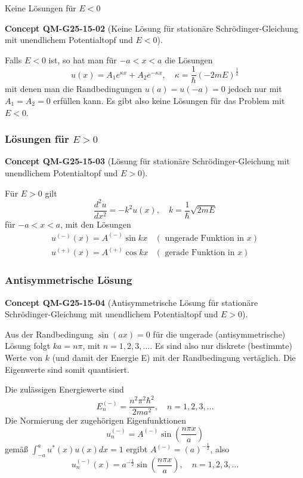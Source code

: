 \documentclass[10pt, letterpaper]{article}
\newcommand{\CustomHeading}[3]{%
  \par\medskip\noindent%
  \textbf{#1 #2} \textnormal{(#3)}.\enskip%
}
\newenvironment{CONC}[2]{\begin{unitbox}\CustomHeading{Concept}{#1}{#2}}{\end{unitbox}}
\begin{document}
Keine Lösungen für $E<0$

\begin{CONC}{QM-G25-15-02}{Keine Lösung für stationäre Schrödinger-Gleichung mit unendlichem Potentialtopf und $E<0$}
Falls $E<0$ ist, so hat man für $-a<x<a$ die Lösungen
$$
u(x)=A_{1} e^{\kappa x}+A_{2} e^{-\kappa x}, \quad \kappa=\frac{1}{\hbar}(-2 m E)^{\frac{1}{2}}
$$
mit denen man die Randbedingungen $u(a)=u(-a)=0$ jedoch nur mit $A_{1}=A_{2}=0$ erfüllen kann. Es gibt also keine Lösungen für das Problem mit $E<0$.
\end{CONC}

\subsubsection*{Lösungen für $E>0$}

\begin{CONC}{QM-G25-15-03}{Lösung für stationäre Schrödinger-Gleichung mit unendlichem Potentialtopf und $E>0$}
Für $E>0$ gilt
$$
\frac{d^{2} u}{d x^{2}}=-k^{2} u(x), \quad k=\frac{1}{\hbar} \sqrt{2 m E}
$$
für $-a<x<a$, mit den Lösungen
$$
\begin{array}{ll}
u^{(-)}(x)=A^{(-)} \sin k x & (\text { ungerade Funktion in } x) \\
u^{(+)}(x)=A^{(+)} \cos k x & (\text { gerade Funktion in } x)
\end{array}
$$
\end{CONC}



\subsubsection*{Antisymmetrische Lösung}


\begin{CONC}{QM-G25-15-04}{Antisymmetrische Lösung für stationäre Schrödinger-Gleichung mit unendlichem Potentialtopf und $E>0$}
Aus der Randbedingung $\sin (a x)=0$ für die ungerade (antisymmetrische) Lösung folgt $k a=n \pi$, mit $n=1,2,3, \ldots$. Es sind also nur diskrete (bestimmte) Werte von $k$ (und damit der Energie E) mit der Randbedingung vertäglich. Die Eigenwerte sind somit quantisiert.

Die zulässigen Energiewerte sind
$$
E_{n}^{(-)}=\frac{n^{2} \pi^{2} \hbar^{2}}{2 m a^{2}}, \quad n=1,2,3, \ldots
$$
Die Normierung der zugehörigen Eigenfunktionen
$$
u_{n}^{(-)}=A^{(-)} \sin \left(\frac{n \pi x}{a}\right)
$$
gemäß $\int_{-a}^{a} u^{*}(x) u(x) d x=1$ ergibt $A^{(-)}=(a)^{-\frac{1}{2}}$, also
$$
u_{n}^{(-)}(x)=a^{-\frac{1}{2}} \sin \left(\frac{n \pi x}{a}\right), \quad n=1,2,3, \ldots
$$
\end{CONC}
\end{document}
